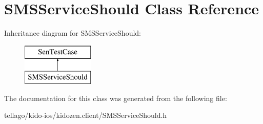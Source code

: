 \hypertarget{interface_s_m_s_service_should}{\section{S\-M\-S\-Service\-Should Class Reference}
\label{interface_s_m_s_service_should}
}
Inheritance diagram for S\-M\-S\-Service\-Should\-:\begin{figure}[H]
\begin{center}
\leavevmode
\includegraphics[height=2.000000cm]{interface_s_m_s_service_should}
\end{center}
\end{figure}


The documentation for this class was generated from the following file\-:\begin{DoxyCompactItemize}
\item 
tellago/kido-\/ios/kidozen.\-client/S\-M\-S\-Service\-Should.\-h\end{DoxyCompactItemize}

